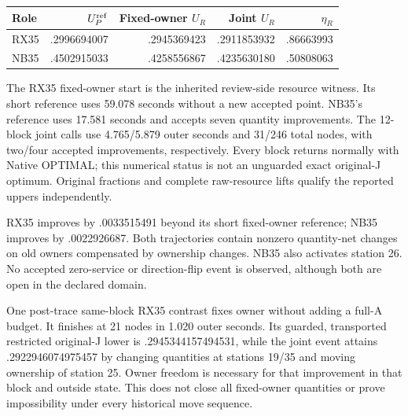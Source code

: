 \begin{center}
\begin{tabular}{lrrrr}
\toprule
Role & $U_P^{\rm ref}$ & Fixed-owner $U_R$ & Joint $U_R$ & $\eta_R$\\
\midrule
RX35 & .2996694007 & .2945369423 & .2911853932 & .86663993\\
NB35 & .4502915033 & .4258556867 & .4235630180 & .50808063\\
\bottomrule
\end{tabular}
\end{center}
The RX35 fixed-owner start is the inherited review-side resource witness.
Its short reference uses 59.078 seconds without a new accepted point. NB35's
reference uses 17.581 seconds and accepts seven quantity improvements.
The 12-block joint calls use 4.765/5.879 outer seconds and 31/246 total nodes,
with two/four accepted improvements, respectively. Every block returns
normally with Native OPTIMAL; this numerical status is not an unguarded
exact original-J optimum. Original fractions and complete raw-resource
lifts qualify the reported uppers independently.

RX35 improves by .0033515491 beyond its short fixed-owner reference;
NB35 improves by .0022926687. Both trajectories contain nonzero quantity-net
changes on old owners compensated by ownership changes. NB35 also
activates station 26. No accepted zero-service or direction-flip event is
observed, although both are open in the declared domain.

One post-trace same-block RX35 contrast fixes owner without adding a full-A
budget. It finishes at 21 nodes in 1.020 outer seconds. Its guarded,
transported restricted original-J lower is .2945344157494531, while the
joint event attains .2922946074975457 by changing quantities at stations 19/35
and moving ownership of station 25. Owner freedom is necessary for that
improvement in that block and outside state. This does not close all
fixed-owner quantities or prove impossibility under every historical move
sequence.

